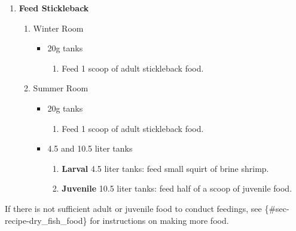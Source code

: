 \documentclass[
  letterpaper,
  DIV=11,
  numbers=noendperiod]{scrreprt}
\providecommand{\tightlist}{%
  \setlength{\itemsep}{0pt}\setlength{\parskip}{0pt}}\usepackage{longtable,booktabs,array}
\begin{document}
\begin{enumerate}
\def\labelenumi{\arabic{enumi}.}
\setcounter{enumi}{2}
\item
  \textbf{Feed Stickleback}

  \begin{enumerate}
  \def\labelenumii{\arabic{enumii}.}
  \tightlist
  \item
    Winter Room

    \begin{itemize}
    \tightlist
    \item
      20g tanks

      \begin{enumerate}
      \def\labelenumiii{\arabic{enumiii}.}
      \tightlist
      \item
        Feed 1 scoop of adult stickleback food.
      \end{enumerate}
    \end{itemize}
  \item
    Summer Room

    \begin{itemize}
    \tightlist
    \item
      20g tanks

      \begin{enumerate}
      \def\labelenumiii{\arabic{enumiii}.}
      \tightlist
      \item
        Feed 1 scoop of adult stickleback food.
      \end{enumerate}
    \item
      4.5 and 10.5 liter tanks

      \begin{enumerate}
      \def\labelenumiii{\arabic{enumiii}.}
      \tightlist
      \item
        \textbf{Larval} 4.5 liter tanks: feed small squirt of brine
        shrimp.
      \item
        \textbf{Juvenile} 10.5 liter tanks: feed half of a scoop of
        juvenile food.
      \end{enumerate}
    \end{itemize}
  \end{enumerate}
\end{enumerate}

\begin{tcolorbox}[enhanced jigsaw, bottomtitle=1mm, rightrule=.15mm, toptitle=1mm, opacitybacktitle=0.6, bottomrule=.15mm, titlerule=0mm, coltitle=black, leftrule=.75mm, arc=.35mm, colback=white, colframe=quarto-callout-note-color-frame, left=2mm, colbacktitle=quarto-callout-note-color!10!white, title=\textcolor{quarto-callout-note-color}{\faInfo}\hspace{0.5em}{NOTES}, toprule=.15mm, opacityback=0, breakable]

If there is not sufficient adult or juvenile food to conduct feedings,
see \{\#sec-recipe-dry\_fish\_food\} for instructions on making more
food.

\end{tcolorbox}
\end{document}
